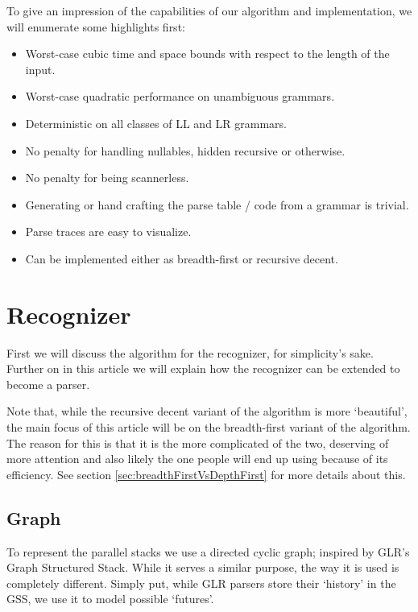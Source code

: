 \documentclass[a4paper,10pt]{article}
\begin{document}
To give an impression of the capabilities of our algorithm and implementation, we will enumerate some highlights first:
\begin{itemize}
 \setlength{\itemsep}{0pt}
 \setlength{\parskip}{0pt}
 \setlength{\parsep}{0pt}
 
 \item Worst-case cubic time and space bounds with respect to the length of the input.
 \item Worst-case quadratic performance on unambiguous grammars.
 \item Deterministic on all classes of LL and LR grammars.
 \item No penalty for handling nullables, hidden recursive or otherwise.
 \item No penalty for being scannerless.
 \item Generating or hand crafting the parse table / code from a grammar is trivial.
 \item Parse traces are easy to visualize.
 \item Can be implemented either as breadth-first or recursive decent.
\end{itemize}

\section{Recognizer}

First we will discuss the algorithm for the recognizer, for simplicity's sake. Further on in this article we will explain how the recognizer can be extended to become a parser.

Note that, while the recursive decent variant of the algorithm is more `beautiful', the main focus of this article will be on the breadth-first variant of the algorithm. The reason for this is that it is the more complicated of the two, deserving of more attention and also likely the one people will end up using because of its efficiency. See section \ref{sec:breadthFirstVsDepthFirst} for more details about this.

\subsection{Graph}

To represent the parallel stacks we use a directed cyclic graph; inspired by GLR's Graph Structured Stack. While it serves a similar purpose, the way it is used is completely different. Simply put, while GLR parsers store their `history' in the GSS, we use it to model possible `futures'.
\end{document}
